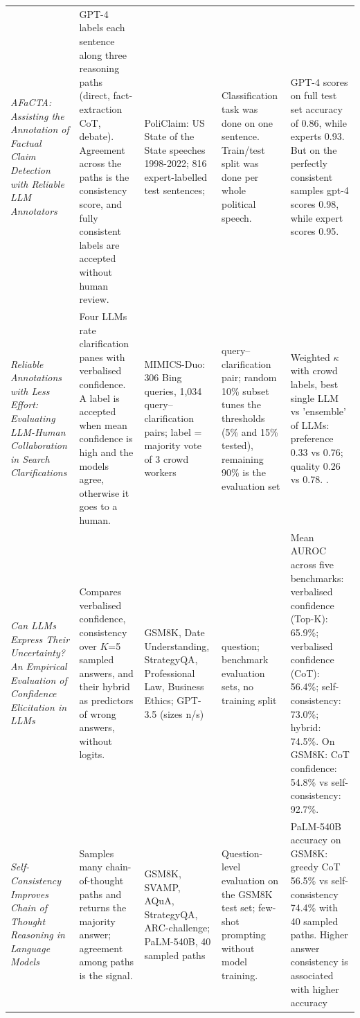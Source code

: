 \documentclass[11pt]{article}
\begin{document}
\begin{table}[t!]
\begin{tabular}{@{}P{0.19\textwidth} P{0.19\textwidth} P{0.13\textwidth} P{0.17\textwidth} P{0.25\textwidth}@{}}
\textit{AFaCTA: Assisting the Annotation of Factual Claim Detection with Reliable LLM Annotators} \cite{afacta-assist} & GPT-4 labels each sentence along three reasoning paths (direct, fact-extraction CoT, debate). Agreement across the paths is the consistency score, and fully consistent labels are accepted without human review. & PoliClaim: US State of the State speeches 1998-2022; 816 expert-labelled test sentences; 

& Classification task was done on one sentence. Train/test split was done per whole political speech. &
GPT-4 scores on full test set accuracy of 0.86, while experts 0.93. 
But on the perfectly consistent samples gpt-4 scores 0.98, while expert scores 0.95.
\\

\textit{Reliable Annotations with Less Effort: Evaluating LLM-Human Collaboration in Search Clarifications} \cite{reliable-annot} & Four LLMs rate clarification panes with verbalised confidence. A label is accepted when mean confidence is high and the models agree, otherwise it goes to a human. & MIMICS-Duo: 306 Bing queries, 1,034 query--clarification pairs; label = majority vote of 3 crowd workers & query--clarification pair; random 10\% subset tunes the thresholds (5\% and 15\% tested), remaining 90\% is the evaluation set &
Weighted $\kappa$ with crowd labels, best single LLM vs 'ensemble' of LLMs: preference 0.33 vs 0.76; quality 0.26 vs 0.78.
.\\

\textit{Can LLMs Express Their Uncertainty? An Empirical Evaluation of Confidence Elicitation in LLMs} \cite{can-llm-expre} & Compares verbalised confidence, consistency over $K$=5 sampled answers, and their hybrid as predictors of wrong answers, without logits. & GSM8K, Date Understanding, StrategyQA, Professional Law, Business Ethics; GPT-3.5 (sizes n/s) & question; benchmark evaluation sets, no training split &

Mean AUROC across five benchmarks: verbalised confidence (Top-K): 65.9\%; verbalised confidence (CoT): 56.4\%; self-consistency: 73.0\%; hybrid: 74.5\%. On GSM8K: CoT confidence: 54.8\% vs self-consistency: 92.7\%.\\




\textit{Self-Consistency Improves Chain of Thought Reasoning in Language Models} \cite{self-consistency-imrpov} & Samples many chain-of-thought paths and returns the majority answer; agreement among paths is the signal. & GSM8K, SVAMP, AQuA, StrategyQA, ARC-challenge; PaLM-540B, 40 sampled paths & Question-level evaluation on the GSM8K test set; few-shot prompting without model training. &
PaLM-540B accuracy on GSM8K: greedy CoT 56.5\% vs self-consistency 74.4\% with 40 sampled paths. Higher answer consistency is associated with higher accuracy\\




\end{tabular}
\end{table}
\end{document}
